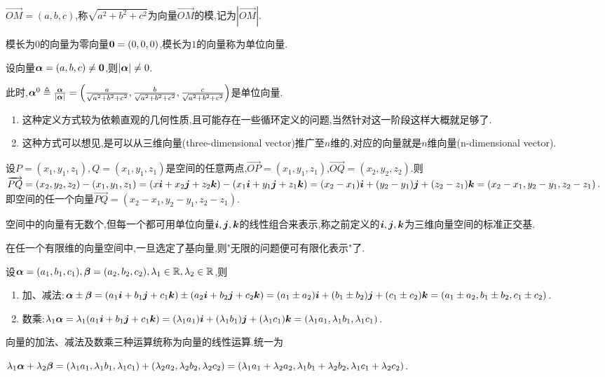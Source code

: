 \begin{definition}
    $\overrightarrow{OM}=(a,b,c)$,称$\sqrt{a^2+b^2+c^2}$为向量$\overrightarrow{OM}$的模,记为$\left|\overrightarrow{OM}\right|$.

    模长为$0$的向量为零向量$\bm{0}=(0,0,0)$,模长为$1$的向量称为单位向量.
\end{definition}
\begin{proposition}
    设向量$\bm{\alpha}=(a,b,c)\neq \bm{0}$,则$\left|\bm{\alpha}\right|\neq 0$.
    
    此时,$\bm{\alpha}^0\triangleq\frac{\bm{\alpha}}{\left|\bm{\alpha}\right|}=\left(\frac{a}{\sqrt{a^2+b^2+c^2}},\frac{b}{\sqrt{a^2+b^2+c^2}},\frac{c}{\sqrt{a^2+b^2+c^2}}\right)$是单位向量.
\end{proposition}


\begin{remark}
\begin{enumerate}
    \item 这种定义方式较为依赖直观的几何性质,且可能存在一些循环定义的问题,当然针对这一阶段这样大概就足够了.
    \item 这种方式可以想见,是可以从三维向量(three-dimensional vector)推广至$n$维的,对应的向量就是$n$维向量(n-dimensional vector).
\end{enumerate}
\end{remark}
设$P=(x_1,y_1,z_1),Q=(x_1,y_1,z_1)$是空间的任意两点,$\overrightarrow{OP}=(x_1,y_1,z_1)$,$\overrightarrow{OQ}=(x_2,y_2,z_2)$.则$\overrightarrow{PQ}=(x_2,y_2,z_2)-(x_1,y_1,z_1)=(x\bm{i}+x_2\bm{j}+z_2\bm{k})-(x_1\bm{i}+y_1\bm{j}+z_1\bm{k})=(x_2-x_1)\bm{i}+(y_2-y_1)\bm{j}+(z_2-z_1)\bm{k}=(x_2-x_1,y_2-y_1,z_2-z_1)$.
即空间的任一个向量$\overrightarrow{PQ}=(x_2-x_1,y_2-y_1,z_2-z_1)$.

空间中的向量有无数个,但每一个都可用单位向量$\bm{i},\bm{j},\bm{k}$的线性组合来表示,称之前定义的$\bm{i},\bm{j},\bm{k}$为三维向量空间的标准正交基.

在任一个有限维的向量空间中,一旦选定了基向量,则"无限的问题便可有限化表示"了.

\begin{proposition}[三维数组向量的线性运算法则]
    设$\bm{\alpha}=(a_1,b_1,c_1),\bm{\beta}=(a_2,b_2,c_2),\lambda_1\in\mathbb{R},\lambda_2\in\mathbb{R}$,则
    \begin{enumerate}
        \item 加、减法:$\bm{\alpha}\pm\bm{\beta}=(a_1\bm{i}+b_1\bm{j}+c_1\bm{k})\pm(a_2\bm{i}+b_2\bm{j}+c_2\bm{k})=(a_1\pm a_2)\bm{i}+(b_1\pm b_2)\bm{j}+(c_1\pm c_2)\bm{k}=(a_1\pm a_2,b_1\pm b_2,c_1\pm c_2)$.
        \item 数乘:$\lambda_1\bm{\alpha}=\lambda_1(a_1\bm{i}+b_1\bm{j}+c_1\bm{k})=(\lambda_1a_1)\bm{i}+(\lambda_1b_1)\bm{j}+(\lambda_1c_1)\bm{k}=(\lambda_1a_1,\lambda_1b_1,\lambda_1c_1)$.
    \end{enumerate}
    向量的加法、减法及数乘三种运算统称为向量的线性运算.统一为
    
    $\lambda_1\bm{\alpha}+\lambda_2\bm{\beta}=(\lambda_1a_1,\lambda_1b_1,\lambda_1c_1)+(\lambda_2a_2,\lambda_2b_2,\lambda_2c_2)=(\lambda_1a_1+\lambda_2a_2,\lambda_1b_1+\lambda_2b_2,\lambda_1c_1+\lambda_2c_2)$.
\end{proposition}

